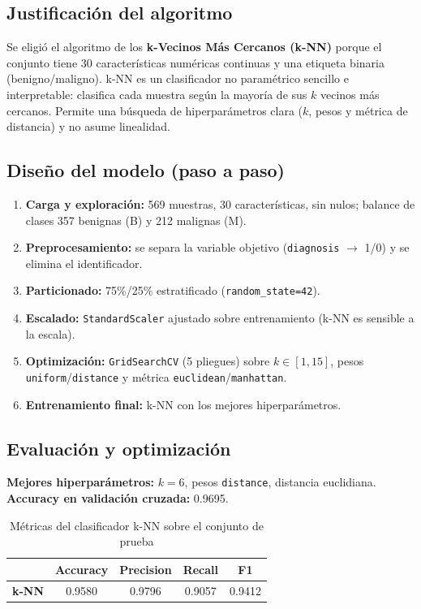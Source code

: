 \documentclass[12pt,a4paper]{article}
\begin{document}
\subsection{Justificación del algoritmo}
Se eligió el algoritmo de los \textbf{k-Vecinos Más Cercanos (k-NN)} porque el
conjunto tiene 30 características numéricas continuas y una etiqueta binaria
(benigno/maligno). k-NN es un clasificador no paramétrico sencillo e interpretable:
clasifica cada muestra según la mayoría de sus $k$ vecinos más cercanos. Permite una
búsqueda de hiperparámetros clara ($k$, pesos y métrica de distancia) y no asume
linealidad.

\subsection{Diseño del modelo (paso a paso)}
\begin{enumerate}[itemsep=2pt]
\item \textbf{Carga y exploración:} 569 muestras, 30 características, sin nulos;
      balance de clases 357 benignas (B) y 212 malignas (M).
\item \textbf{Preprocesamiento:} se separa la variable objetivo
      (\texttt{diagnosis} $\rightarrow$ 1/0) y se elimina el identificador.
\item \textbf{Particionado:} 75\%/25\% estratificado (\texttt{random\_state=42}).
\item \textbf{Escalado:} \texttt{StandardScaler} ajustado sobre entrenamiento
      (k-NN es sensible a la escala).
\item \textbf{Optimización:} \texttt{GridSearchCV} (5 pliegues) sobre
      $k \in [1,15]$, pesos \texttt{uniform}/\texttt{distance} y métrica
      \texttt{euclidean}/\texttt{manhattan}.
\item \textbf{Entrenamiento final:} k-NN con los mejores hiperparámetros.
\end{enumerate}

\subsection{Evaluación y optimización}
\textbf{Mejores hiperparámetros:} $k=6$, pesos \texttt{distance}, distancia
euclidiana. \textbf{Accuracy en validación cruzada:} 0.9695.

\begin{table}[H]
\centering
\caption{Métricas del clasificador k-NN sobre el conjunto de prueba}
\small\setlength{\tabcolsep}{5pt}\begin{tabular}{lcccc}
\toprule
 & \textbf{Accuracy} & \textbf{Precision} & \textbf{Recall} & \textbf{F1} \\
\midrule
\textbf{k-NN} & 0.9580 & 0.9796 & 0.9057 & 0.9412 \\
\bottomrule
\end{tabular}
\end{table}
\end{document}
